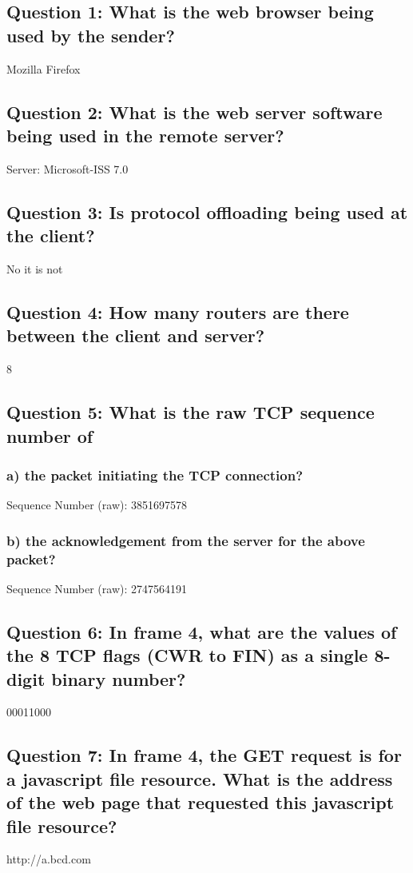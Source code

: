 \documentclass[11pt, oneside, a4paper]{article}
\begin{document}
\subsection*{Question 1: What is the web browser being used by the sender?}
Mozilla Firefox

\subsection*{Question 2: What is the web server software being used in the remote server?}
Server: Microsoft-ISS 7.0

\subsection*{Question 3: Is protocol offloading being used at the client?}
No it is not

\subsection*{Question 4: How many routers are there between the client and server?}
8

\subsection*{Question 5: What is the raw TCP sequence number of}

  \subsubsection*{a) the packet initiating the TCP connection?}
  Sequence Number (raw): 3851697578
  \subsubsection*{b) the acknowledgement from the server for the above packet?}
  Sequence Number (raw): 2747564191

\subsection*{Question 6: In frame 4, what are the values of the 8 TCP flags (CWR to FIN) as a single 8-digit binary number?}
00011000

\subsection*{Question 7: In frame 4, the GET request is for a javascript file resource. What is the address of the web page that requested this javascript file resource?}
http://a.bcd.com
\end{document}
